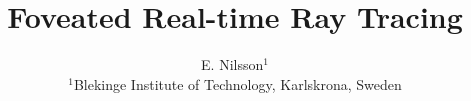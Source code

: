 

\usepackage{gensymb} %
\usepackage{algorithm} %
\usepackage{algpseudocode} %
\usepackage{graphicx} %
\usepackage{hyperref} %
\usepackage{float} %
\usepackage{stfloats} %
\usepackage{pgf} %

\newcommand*{\no}[1]{%
    \pgfmathprintnumber[
        fixed,
        precision=3,
        fixed zerofill=true,
        ]{#1}}%


\let\OLDthebibliography\thebibliography
\renewcommand\thebibliography[1]{
  \OLDthebibliography{#1}
  \setlength{\parskip}{0pt}
  \setlength{\itemsep}{0pt plus 0.3ex}
}

\title[Foveated Real-time Ray Tracing]{Foveated Real-time Ray Tracing}

\author[E. Nilsson]
       {E. Nilsson$^{1}$\\
        $^1$Blekinge Institute of Technology, Karlskrona, Sweden
       }

%



\maketitle







{}



